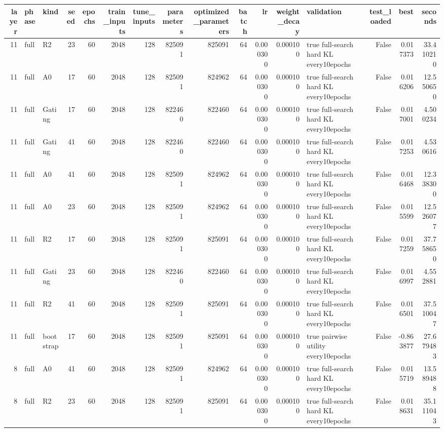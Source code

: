\begin{tabular}{rllrrrrrrrrrlrrr}
\toprule
layer & phase & kind & seed & epochs & train_inputs & tune_inputs & parameters & optimized_parameters & batch & lr & weight_decay & validation & test_loaded & best & seconds \\
\midrule
11 & full & R2 & 23 & 60 & 2048 & 128 & 825091 & 825091 & 64 & 0.000300 & 0.000100 & true full-search hard KL every10epochs & False & 0.017373 & 33.410210 \\
11 & full & A0 & 17 & 60 & 2048 & 128 & 825091 & 824962 & 64 & 0.000300 & 0.000100 & true full-search hard KL every10epochs & False & 0.016206 & 12.550650 \\
11 & full & Gating & 17 & 60 & 2048 & 128 & 822460 & 822460 & 64 & 0.000300 & 0.000100 & true full-search hard KL every10epochs & False & 0.017001 & 4.500234 \\
11 & full & Gating & 41 & 60 & 2048 & 128 & 822460 & 822460 & 64 & 0.000300 & 0.000100 & true full-search hard KL every10epochs & False & 0.017253 & 4.530616 \\
11 & full & A0 & 41 & 60 & 2048 & 128 & 825091 & 824962 & 64 & 0.000300 & 0.000100 & true full-search hard KL every10epochs & False & 0.016468 & 12.338300 \\
11 & full & A0 & 23 & 60 & 2048 & 128 & 825091 & 824962 & 64 & 0.000300 & 0.000100 & true full-search hard KL every10epochs & False & 0.015599 & 12.526077 \\
11 & full & R2 & 17 & 60 & 2048 & 128 & 825091 & 825091 & 64 & 0.000300 & 0.000100 & true full-search hard KL every10epochs & False & 0.017259 & 37.758650 \\
11 & full & Gating & 23 & 60 & 2048 & 128 & 822460 & 822460 & 64 & 0.000300 & 0.000100 & true full-search hard KL every10epochs & False & 0.016997 & 4.552881 \\
11 & full & R2 & 41 & 60 & 2048 & 128 & 825091 & 825091 & 64 & 0.000300 & 0.000100 & true full-search hard KL every10epochs & False & 0.016501 & 37.510047 \\
11 & full & bootstrap & 17 & 60 & 2048 & 128 & 825091 & 825091 & 64 & 0.000300 & 0.000100 & true pairwise utility every10epochs & False & -0.863877 & 27.679483 \\
8 & full & A0 & 41 & 60 & 2048 & 128 & 825091 & 824962 & 64 & 0.000300 & 0.000100 & true full-search hard KL every10epochs & False & 0.015719 & 13.589488 \\
8 & full & R2 & 23 & 60 & 2048 & 128 & 825091 & 825091 & 64 & 0.000300 & 0.000100 & true full-search hard KL every10epochs & False & 0.018631 & 35.111043 \\

\end{tabular}
